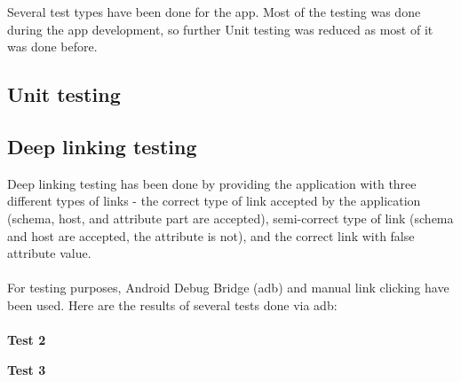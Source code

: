 \hspace{\parindent}Several test types have been done for the app. Most of the testing was done during the app development, so further Unit testing was reduced as most of it was done before.

\subsection{Unit testing}
\subsection{Deep linking testing}
\hspace{\parindent}Deep linking testing has been done by providing the application with three different types of links - the correct type of link accepted by the application (schema, host, and attribute part are accepted), semi-correct type of link (schema and host are accepted, the attribute is not), and the correct link with false attribute value.\\ \\

For testing purposes, Android Debug Bridge (adb) and manual link clicking have been used. Here are the results of several tests done via adb:\\ \\



\textbf{Test 2}

\textbf{Test 3}